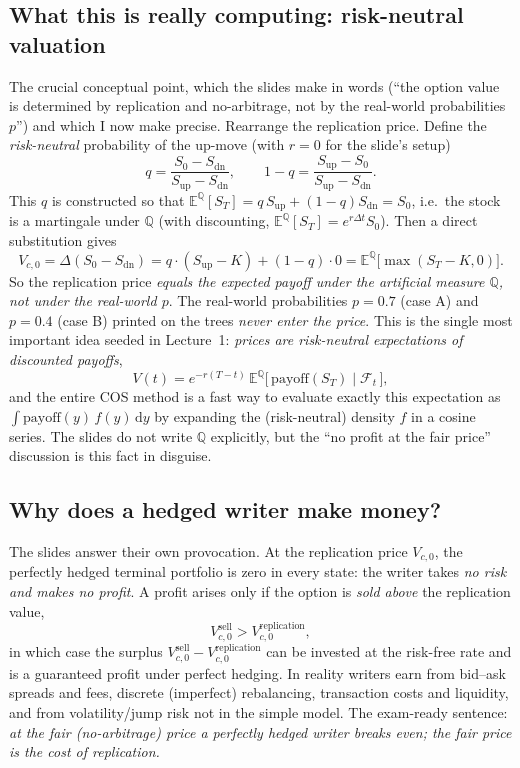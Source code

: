 \documentclass[11pt]{article}
\newcommand{\E}{\mathbb{E}}
\newcommand{\dd}{\,\mathrm{d}}
\begin{document}
\subsection{What this is really computing: risk-neutral valuation}

The crucial conceptual point, which the slides make in words (``the option value is determined by replication and no-arbitrage, not by the real-world probabilities $p$'') and which I now make precise. Rearrange the replication price. Define the \emph{risk-neutral} probability of the up-move (with $r=0$ for the slide's setup)
\[
q=\frac{S_0-S_{\mathrm{dn}}}{S_{\mathrm{up}}-S_{\mathrm{dn}}},\qquad 1-q=\frac{S_{\mathrm{up}}-S_0}{S_{\mathrm{up}}-S_{\mathrm{dn}}}.
\]
This $q$ is constructed so that $\E^{\mathbb{Q}}[S_T]=q\,S_{\mathrm{up}}+(1-q)S_{\mathrm{dn}}=S_0$, i.e.\ the stock is a martingale under $\mathbb{Q}$ (with discounting, $\E^{\mathbb{Q}}[S_T]=e^{r\Delta t}S_0$). Then a direct substitution gives
\[
V_{c,0}=\Delta(S_0-S_{\mathrm{dn}})
= q\cdot(S_{\mathrm{up}}-K)+(1-q)\cdot 0
=\E^{\mathbb{Q}}\!\big[\max(S_T-K,0)\big].
\]
So the replication price \emph{equals the expected payoff under the artificial measure $\mathbb{Q}$, not under the real-world $p$}. The real-world probabilities $p=0.7$ (case A) and $p=0.4$ (case B) printed on the trees \emph{never enter the price}. This is the single most important idea seeded in Lecture~1: \emph{prices are risk-neutral expectations of discounted payoffs},
\[
V(t)=e^{-r(T-t)}\,\E^{\mathbb{Q}}\big[\,\text{payoff}(S_T)\mid \mathcal{F}_t\,\big],
\]
and the entire COS method is a fast way to evaluate exactly this expectation as $\int \text{payoff}(y)\,f(y)\dd y$ by expanding the (risk-neutral) density $f$ in a cosine series. The slides do not write $\mathbb{Q}$ explicitly, but the ``no profit at the fair price'' discussion is this fact in disguise.

\subsection{Why does a hedged writer make money?}

The slides answer their own provocation. At the replication price $V_{c,0}$, the perfectly hedged terminal portfolio is zero in every state: the writer takes \emph{no risk and makes no profit}. A profit arises only if the option is \emph{sold above} the replication value,
\[
V^{\text{sell}}_{c,0}>V^{\text{replication}}_{c,0},
\]
in which case the surplus $V^{\text{sell}}_{c,0}-V^{\text{replication}}_{c,0}$ can be invested at the risk-free rate and is a guaranteed profit under perfect hedging. In reality writers earn from bid--ask spreads and fees, discrete (imperfect) rebalancing, transaction costs and liquidity, and from volatility/jump risk not in the simple model. The exam-ready sentence: \emph{at the fair (no-arbitrage) price a perfectly hedged writer breaks even; the fair price is the cost of replication.}
\end{document}
